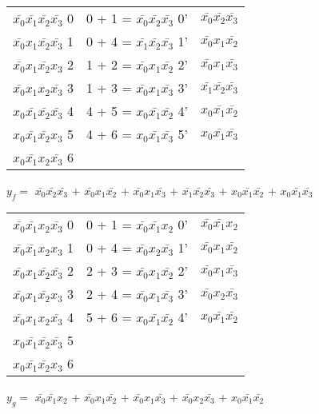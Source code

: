\documentclass{bmstu}
\begin{document}
	\begin{center}
		\begin{tabular}{ |c|c|c| }
			\hline
		$\bar{x_0} \bar{x_1} \bar{x_2} \bar{x_3} $  0&0 + 1 = $\bar{x_0} \bar{x_2} \bar{x_3} $  0' &$\bar{x_0} \bar{x_2} \bar{x_3} $\\
		$\bar{x_0} x_1 \bar{x_2} \bar{x_3} $  1&0 + 4 = $\bar{x_1} \bar{x_2} \bar{x_3} $  1' &$\bar{x_0} x_1 \bar{x_2} $\\
		$\bar{x_0} x_1 \bar{x_2} x_3 $  2&1 + 2 = $\bar{x_0} x_1 \bar{x_2} $  2' &$\bar{x_0} x_1 \bar{x_3} $\\
		$\bar{x_0} x_1 x_2 \bar{x_3} $  3&1 + 3 = $\bar{x_0} x_1 \bar{x_3} $  3' &$\bar{x_1} \bar{x_2} \bar{x_3} $\\
		$x_0 \bar{x_1} \bar{x_2} \bar{x_3} $  4&4 + 5 = $x_0 \bar{x_1} \bar{x_2} $  4' &$x_0 \bar{x_1} \bar{x_2} $\\
		$x_0 \bar{x_1} \bar{x_2} x_3 $  5&4 + 6 = $x_0 \bar{x_1} \bar{x_3} $  5' &$x_0 \bar{x_1} \bar{x_3} $\\
		$x_0 \bar{x_1} x_2 \bar{x_3} $  6& &   \\
			\hline
		\end{tabular}
	\end{center}
	$y_f =$ $\bar{x_0} \bar{x_2} \bar{x_3} $ + $\bar{x_0} x_1 \bar{x_2} $ + $\bar{x_0} x_1 \bar{x_3} $ + $\bar{x_1} \bar{x_2} \bar{x_3} $ + $x_0 \bar{x_1} \bar{x_2} $ + $x_0 \bar{x_1} \bar{x_3} $


	\begin{center}
		\begin{tabular}{ |c|c|c| }
			\hline
		$\bar{x_0} \bar{x_1} x_2 \bar{x_3} $  0&0 + 1 = $\bar{x_0} \bar{x_1} x_2 $  0' &$\bar{x_0} \bar{x_1} x_2 $\\
		$\bar{x_0} \bar{x_1} x_2 x_3 $  1&0 + 4 = $\bar{x_0} x_2 \bar{x_3} $  1' &$\bar{x_0} x_1 \bar{x_2} $\\
		$\bar{x_0} x_1 \bar{x_2} \bar{x_3} $  2&2 + 3 = $\bar{x_0} x_1 \bar{x_2} $  2' &$\bar{x_0} x_1 \bar{x_3} $\\
		$\bar{x_0} x_1 \bar{x_2} x_3 $  3&2 + 4 = $\bar{x_0} x_1 \bar{x_3} $  3' &$\bar{x_0} x_2 \bar{x_3} $\\
		$\bar{x_0} x_1 x_2 \bar{x_3} $  4&5 + 6 = $x_0 \bar{x_1} \bar{x_2} $  4' &$x_0 \bar{x_1} \bar{x_2} $\\
		$x_0 \bar{x_1} \bar{x_2} \bar{x_3} $  5& &   \\
		$x_0 \bar{x_1} \bar{x_2} x_3 $  6& &   \\
			\hline
		\end{tabular}
	\end{center}
	$y_g =$ $\bar{x_0} \bar{x_1} x_2 $ + $\bar{x_0} x_1 \bar{x_2} $ + $\bar{x_0} x_1 \bar{x_3} $ + $\bar{x_0} x_2 \bar{x_3} $ + $x_0 \bar{x_1} \bar{x_2} $
\end{document}
